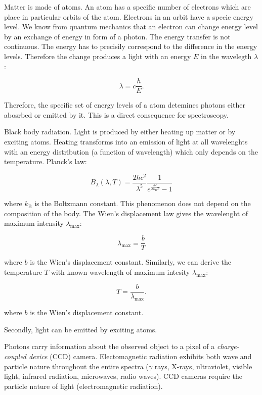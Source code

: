 \documentclass[thesis=M,english]{FITthesis}[2012/10/20]
\begin{document}
Matter is made of atoms.
An atom has a specific number of electrons which are place in particular orbits of the atom.
Electrons in an orbit have a specic energy level.
We know from quantum mechanics that an electron can change energy level by an exchange of energy in form of a photon.
The energy transfer is not continuous.
The energy has to precisily correspond to the difference in the energy levels.
Therefore the change produces a light with an energy \(E\) in the wavelegth \(\lambda\):

\begin{equation}
	\lambda = c \frac{h}{E}.
\end{equation}

Therefore, the specific set of energy levels of a atom detemines photons either abosrbed or emitted by it.
This is a direct consequence for spectroscopy.~\cite{cochard2018}

Black body radiation.
Light is produced by either heating up matter or by exciting atoms.
Heating transforms into an emission of light at all wavelenghts with an energy distribution (a function of wavelength) which only depends on the temperature.
Planck's law:

\begin{equation}
	B_{\lambda}(\lambda, T) = \frac{2 h c^2}{\lambda^5} \frac{1}{e^{\frac{hc}{\lambda k_{\mathrm{B}}T}} - 1}
\end{equation}

where \(k_{\mathrm{B}}\) is the Boltzmann constant.
This phenomenon does not depend on the composition of the body.
The Wien's displacement law gives the wavelenght of maximum intensity \(\lambda_{\max}\):

\begin{equation}
	\lambda_{\max} = \frac{b}{T}
\end{equation}

where \(b\) is the Wien's displacement constant.
Similarly, we can derive the temperature \(T\) with known wavelength of maximum intesity \(\lambda_{\max}\):

\begin{equation}
	T = \frac{b}{\lambda_{\max}}.
\end{equation}

where \(b\) is the Wien's displacement constant.~\cite{cochard2018}

Secondly, light can be emitted by exciting atoms.

Photons carry information about the observed object to a pixel of a \textit{charge-coupled device} (CCD) camera. %
Electomagnetic radiation exhibits both wave and particle nature throughout the entire spectra
(\(\gamma\) rays, X-rays, ultraviolet, visible light, infrared radiation, microwaves, radio waves).
CCD cameras require the particle nature of light (electromagnetic radiation).~\cite{trypsteen2017}
\end{document}

